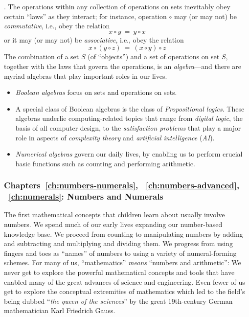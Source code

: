 \medskip

.
%
The operations within any collection of operations on sets inevitably
obey certain ``laws'' as they interact; for instance, operation
$\circ$ may (or may not) be {\em commutative}, i.e., obey the relation
\[ x \circ y \ = \ y \circ x \]
or it may (or may not) be {\em associative}, i.e., obey the relation
\[ x \circ (y \circ z) \ = \ (x \circ y) \circ z \]
The combination of a set $S$ (of ``objects'') and a set of operations
on set $S$, together with the laws that govern the operations, is an
{\em algebra}---and there are myriad algebras that play important
roles in our lives.
\begin{itemize}
\item
{\em Boolean algebras} focus on sets and operations on sets.
\item
A special class of Boolean algebras is the class of {\em Propositional
  logics}.  These algebras underlie computing-related topics that
range from {\em digital logic}, the basis of all computer design, to the
{\em satisfaction problems} that play a major role in aspects of 
{\em complexity theory} and {\em artificial intelligence} ({\em AI}).
\item
{\em Numerical algebras} govern our daily lives, by enabling us to
perform crucial basic functions such as
counting and performing arithmetic.
\end{itemize}


\subsubsection{Chapters~\ref{ch:numbers-numerals},
~\ref{ch:numbers-advanced}, ~\ref{ch:numerals}: Numbers and Numerals}


The first mathematical concepts that children learn about usually
involve numbers.  We spend much of our early lives expanding our
number-based knowledge base.  We proceed from counting to manipulating
numbers by adding and subtracting and multiplying and dividing them.
We progress from using fingers and toes as ``names'' of numbers to
using a variety of numeral-forming schemes.  For many of us,
``mathematics'' {\em means} ``numbers and arithmetic'': We never get
to explore the powerful mathematical concepts and tools that have
enabled many of the great advances of science and engineering.  Even
fewer of us get to explore the conceptual extremities of mathematics
which led to the field's being dubbed ``{\em the queen of the
  sciences}'' by the great $19$th-century German mathematician Karl
Friedrich Gauss. 

